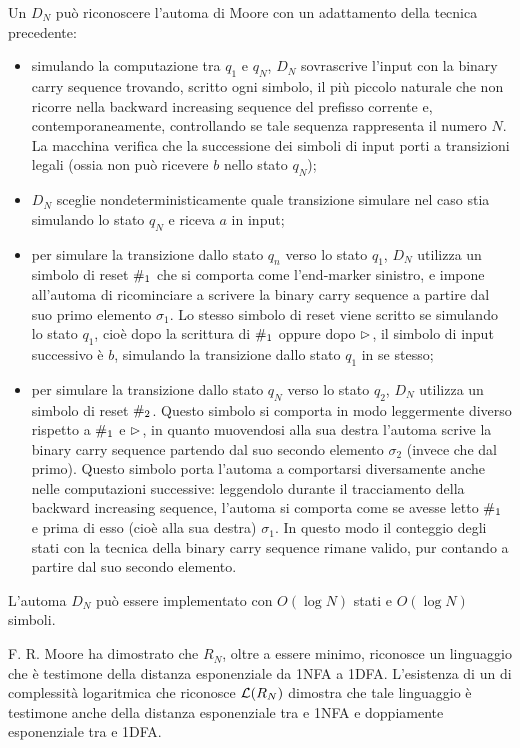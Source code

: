 Un  $D_N$ può riconoscere l'automa di Moore con un adattamento della tecnica precedente:
\begin{itemize}
	\item simulando la computazione tra $q_1$ e $q_N$, $D_N$ sovrascrive l'input con la binary carry sequence trovando, scritto ogni simbolo, il più piccolo naturale che non ricorre nella backward increasing sequence del prefisso corrente e, contemporaneamente, controllando se tale sequenza rappresenta il numero $N$. La macchina verifica che la successione dei simboli di input porti a transizioni legali (ossia non può ricevere $b$ nello stato $q_N$);
	\item $D_N$ sceglie nondeterministicamente quale transizione simulare nel caso stia simulando lo stato $q_N$ e riceva $a$ in input;
	\item per simulare la transizione dallo stato $q_n$ verso lo stato $q_1$, $D_N$ utilizza un simbolo di reset $\#_1$ che si comporta come l'end-marker sinistro, e impone all'automa di ricominciare a scrivere la binary carry sequence a partire dal suo primo elemento $\sigma_1$. Lo stesso simbolo di reset viene scritto se simulando lo stato $q_1$, cioè dopo la scrittura di $\#_1$ oppure dopo $\rhd$, il simbolo di input successivo è $b$, simulando la transizione dallo stato $q_1$ in se stesso;
	\item per simulare la transizione dallo stato $q_N$ verso lo stato $q_2$, $D_N$ utilizza un simbolo di reset $\#_2$. Questo simbolo si comporta in modo leggermente diverso rispetto a $\#_1$ e $\rhd$, in quanto muovendosi alla sua destra l'automa scrive la binary carry sequence partendo dal suo secondo elemento $\sigma_2$ (invece che dal primo). Questo simbolo porta l'automa a comportarsi diversamente anche nelle computazioni successive: leggendolo durante il tracciamento della backward increasing sequence, l'automa si comporta come se avesse letto $\#_1$ e prima di esso (cioè alla sua destra) $\sigma_1$. In questo modo il conteggio degli stati con la tecnica della binary carry sequence rimane valido, pur contando a partire dal suo secondo elemento.
\end{itemize}
L'automa $D_N$ può essere implementato con $O(\log N)$ stati e $O(\log N)$ simboli.

F. R. Moore ha dimostrato che $R_N$, oltre a essere minimo, riconosce un linguaggio che è testimone della distanza esponenziale da 1NFA a 1DFA. L'esistenza di un  di complessità logaritmica che riconosce $\mathcal L(R_N)$ dimostra che tale linguaggio è testimone anche della distanza esponenziale tra  e 1NFA e doppiamente esponenziale tra  e 1DFA.
